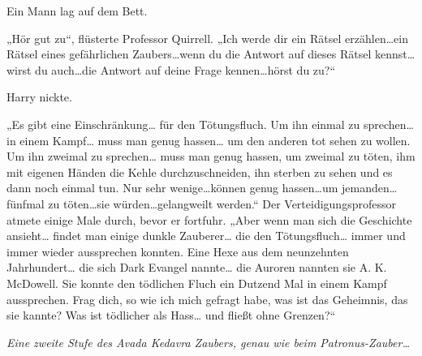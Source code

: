 Ein Mann lag auf dem Bett.

„Hör gut zu“, flüsterte Professor Quirrell.
„Ich werde dir ein Rätsel erzählen…ein Rätsel eines gefährlichen Zaubers…wenn du die Antwort auf dieses Rätsel kennst…wirst du auch…die Antwort auf deine Frage kennen…hörst du zu?“

Harry nickte.

„Es gibt eine Einschränkung… für den Tötungsfluch. Um ihn einmal zu sprechen… in einem Kampf… muss man genug hassen… um den anderen tot sehen zu wollen. Um ihn zweimal zu sprechen… muss man genug hassen, um zweimal zu töten, ihm mit eigenen Händen die Kehle durchzuschneiden, ihn sterben zu sehen und es dann noch einmal tun. Nur sehr wenige…können genug hassen…um jemanden…fünfmal zu töten…sie würden…gelangweilt werden.“
Der Verteidigungsprofessor atmete einige Male durch, bevor er fortfuhr.
„Aber wenn man sich die Geschichte ansieht… findet man einige dunkle Zauberer… die den Tötungsfluch… immer und immer wieder aussprechen konnten. Eine Hexe aus dem neunzehnten Jahrhundert… die sich Dark Evangel nannte… die Auroren nannten sie A. K. McDowell. Sie konnte den tödlichen Fluch ein Dutzend Mal in einem Kampf aussprechen. Frag dich, so wie ich mich gefragt habe, was ist das Geheimnis, das sie kannte? Was ist tödlicher als Hass… und fließt ohne Grenzen?“

\emph{Eine zweite Stufe des Avada Kedavra Zaubers, genau wie beim Patronus-Zauber…}

